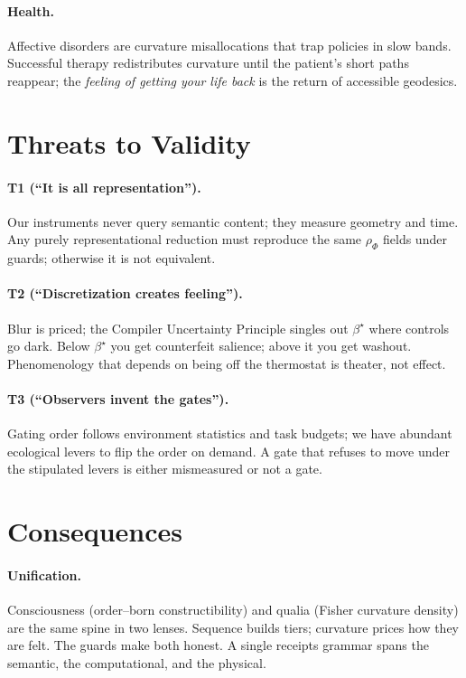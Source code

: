\documentclass[11pt]{article}
\newcommand{\1}{\mathbf{1}}
\begin{document}
\paragraph{Health.} Affective disorders are curvature misallocations that trap policies in slow bands. Successful therapy redistributes curvature until the patient's short paths reappear; the \emph{feeling of getting your life back} is the return of accessible geodesics.

\section{Threats to Validity}
\label{sec:threats}

\paragraph{T1 (``It is all representation'').} Our instruments never query semantic content; they measure geometry and time. Any purely representational reduction must reproduce the same $\rho_{\Phi}$ fields under guards; otherwise it is not equivalent.

\paragraph{T2 (``Discretization creates feeling'').} Blur is priced; the Compiler Uncertainty Principle singles out $\beta^\star$ where controls go dark. Below $\beta^\star$ you get counterfeit salience; above it you get washout. Phenomenology that depends on being off the thermostat is theater, not effect.

\paragraph{T3 (``Observers invent the gates'').} Gating order follows environment statistics and task budgets; we have abundant ecological levers to flip the order on demand. A gate that refuses to move under the stipulated levers is either mismeasured or not a gate.

\section{Consequences}
\label{sec:consequences}

\paragraph{Unification.} Consciousness (order--born constructibility) and qualia (Fisher curvature density) are the same spine in two lenses. Sequence builds tiers; curvature prices how they are felt. The guards make both honest. A single receipts grammar spans the semantic, the computational, and the physical.
\end{document}
